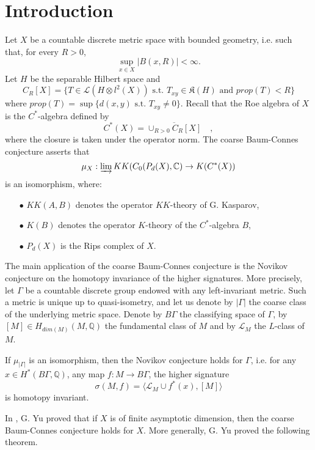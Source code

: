 \section{Introduction}

Let $X$ be a countable discrete metric space with bounded geometry, i.e. such that, for every $R>0$, 
\[\sup_{x\in X} |B(x,R)|<\infty.\] 
Let $H$ be the separable Hilbert space and 
\[C_R[X] = \{T\in \mathcal L(H\otimes l^2(X)) \text{ s.t. } T_{xy} \in \mathfrak K(H) \text{ and } prop(T) < R \}\]
where $prop(T) = \sup\{d(x,y) \text{ s.t. } T_{xy} \neq 0\}$. Recall that the Roe algebra of $X$ is the $C^*$-algebra defined by
\[C^*(X) = \overline{\cup_{R>0} C_R[X]}\quad ,\] 
where the closure is taken under the operator norm. The coarse Baum-Connes conjecture asserts that
\[\mu_X : \varinjlim KK(C_0(P_d(X),\mathbb C) \rightarrow K(C^*(X))\]
is an isomorphism, where:
\begin{itemize}
\item[$\bullet$] $KK(A,B)$ denotes the operator $KK$-theory of G. Kasparov,
\item[$\bullet$] $K(B)$ denotes the operator $K$-theory of the $C^*$-algebra $B$,
\item[$\bullet$] $P_d(X)$ is the Rips complex of $X$.
\end{itemize}

The main application of the coarse Baum-Connes conjecture is the Novikov conjecture on the homotopy invariance of the higher signatures. More precisely, let $\Gamma$ be a countable discrete group endowed with any left-invariant metric. Such a metric is unique up to quasi-isometry, and let us denote by $|\Gamma|$ the coarse class of the underlying metric space. Denote by $B \Gamma$ the classifying space of $\Gamma$, by $[M]\in H_{dim(M)}(M,\mathbb Q)$ the fundamental class of $M$ and by $\mathcal L_M$ the $L$-class of $M$.

\begin{thm}
If $\mu_{|\Gamma|}$ is an isomorphism, then the Novikov conjecture holds for $\Gamma$, i.e. for any $x\in H^*(B\Gamma,\mathbb Q)$, any map $f:M\rightarrow B  \Gamma $, the higher signature
\[ \sigma(M,f) = \langle \mathcal L_M\cup f^*(x) ,[M]\rangle\]
is homotopy invariant.
\end{thm}  

In \cite{Yu1}, G. Yu proved that if $X$ is of finite asymptotic dimension, then the coarse Baum-Connes conjecture holds for $X$. More generally, G. Yu proved the following theorem.

